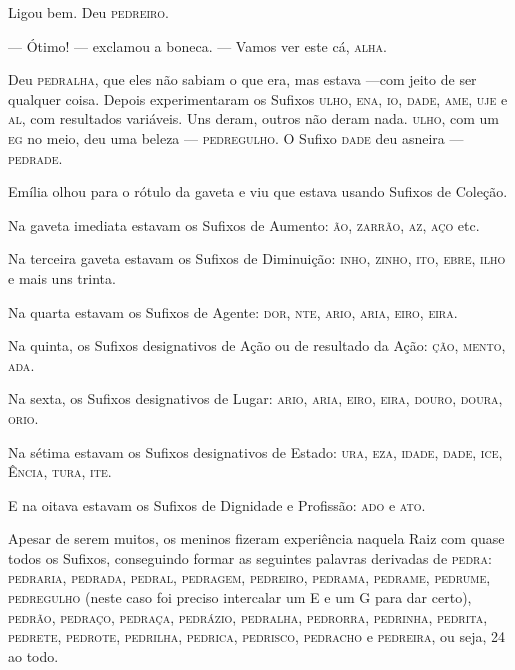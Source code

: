 Ligou bem. Deu \textsc{pedreiro}.

--- Ótimo! --- exclamou a boneca. --- Vamos ver este cá, \textsc{alha}.

Deu \textsc{pedralha}, que eles não sabiam o que era, mas estava ---com jeito de
ser qualquer coisa. Depois experimentaram os Sufixos \textsc{ulho}, \textsc{ena}, \textsc{io},
\textsc{dade}, \textsc{ame}, \textsc{uje} e \textsc{al}, com resultados variáveis. Uns deram, outros não
deram nada. \textsc{ulho}, com um \textsc{eg} no meio, deu uma beleza --- \textsc{pedregulho}. O
Sufixo \textsc{dade} deu asneira ---\textsc{pedrade}.

Emília olhou para o rótulo da gaveta e viu que estava usando Sufixos de
Coleção.

Na gaveta imediata estavam os Sufixos de Aumento: \textsc{ão}, \textsc{zarrão}, \textsc{az}, \textsc{aço} etc.

Na terceira gaveta estavam os Sufixos de Diminuição: \textsc{inho}, \textsc{zinho}, \textsc{ito},
\textsc{ebre}, \textsc{ilho} e mais uns trinta.

Na quarta estavam os Sufixos de Agente: \textsc{dor}, \textsc{nte}, \textsc{ario}, \textsc{aria}, \textsc{eiro},
\textsc{eira}.

Na quinta, os Sufixos designativos de Ação ou de resultado da Ação: \textsc{ção},
\textsc{mento}, \textsc{ada}.

Na sexta, os Sufixos designativos de Lugar: \textsc{ario}, \textsc{aria}, \textsc{eiro}, \textsc{eira},
\textsc{douro}, \textsc{doura}, \textsc{orio}.

Na sétima estavam os Sufixos designativos de Estado: \textsc{ura}, \textsc{eza}, \textsc{idade},
\textsc{dade}, \textsc{ice}, Ê\textsc{ncia}, \textsc{tura}, \textsc{ite}.

E na oitava estavam os Sufixos de Dignidade e Profissão: \textsc{ado} e \textsc{ato}.

Apesar de serem muitos, os meninos fizeram experiência naquela Raiz com
quase todos os Sufixos, conseguindo formar as seguintes palavras
derivadas de \textsc{pedra}: \textsc{pedraria}, \textsc{pedrada}, \textsc{pedral}, \textsc{pedragem}, \textsc{pedreiro},
\textsc{pedrama}, \textsc{pedrame}, \textsc{pedrume}, \textsc{pedregulho} (neste caso foi preciso intercalar
um E e um G para dar certo), \textsc{pedrão}, \textsc{pedraço}, \textsc{pedraça}, \textsc{pedrázio},
\textsc{pedralha}, \textsc{pedrorra}, \textsc{pedrinha}, \textsc{pedrita}, \textsc{pedrete}, \textsc{pedrote}, \textsc{pedrilha},
\textsc{pedrica}, \textsc{pedrisco}, \textsc{pedracho} e \textsc{pedreira}, ou seja, 24 ao todo.

